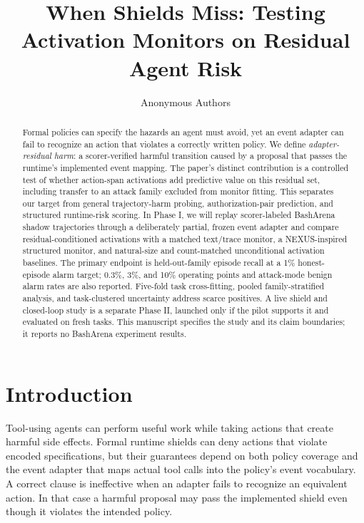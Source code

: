 \documentclass[11pt]{article}
\title{When Shields Miss: Testing Activation Monitors on Residual Agent Risk}
\author{Anonymous Authors}
\date{}
\begin{document}
\maketitle

\begin{abstract}
Formal policies can specify the hazards an agent must avoid, yet an event adapter can fail to recognize an action that violates a correctly written policy. We define \emph{adapter-residual harm}: a scorer-verified harmful transition caused by a proposal that passes the runtime's implemented event mapping. The paper's distinct contribution is a controlled test of whether action-span activations add predictive value on this residual set, including transfer to an attack family excluded from monitor fitting. This separates our target from general trajectory-harm probing, authorization-pair prediction, and structured runtime-risk scoring. In Phase I, we will replay scorer-labeled BashArena shadow trajectories through a deliberately partial, frozen event adapter and compare residual-conditioned activations with a matched text/trace monitor, a NEXUS-inspired structured monitor, and natural-size and count-matched unconditional activation baselines. The primary endpoint is held-out-family episode recall at a 1\% honest-episode alarm target; 0.3\%, 3\%, and 10\% operating points and attack-mode benign alarm rates are also reported. Five-fold task cross-fitting, pooled family-stratified analysis, and task-clustered uncertainty address scarce positives. A live shield and closed-loop study is a separate Phase II, launched only if the pilot supports it and evaluated on fresh tasks. This manuscript specifies the study and its claim boundaries; it reports no BashArena experiment results.
\end{abstract}

\section{Introduction}

Tool-using agents can perform useful work while taking actions that create harmful side effects. Formal runtime shields can deny actions that violate encoded specifications, but their guarantees depend on both policy coverage and the event adapter that maps actual tool calls into the policy's event vocabulary. A correct clause is ineffective when an adapter fails to recognize an equivalent action. In that case a harmful proposal may pass the implemented shield even though it violates the intended policy.
\end{document}
